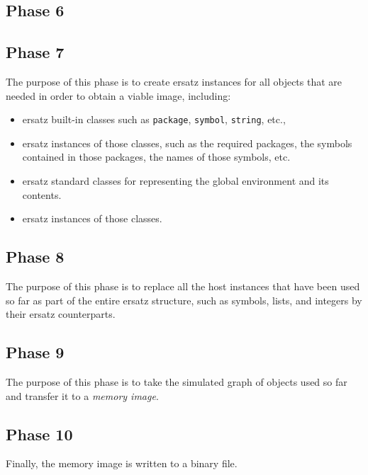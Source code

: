 \subsection{Phase 6}

\subsection{Phase 7}

The purpose of this phase is to create ersatz instances for all
objects that are needed in order to obtain a viable image, including:

\begin{itemize}
\item ersatz built-in classes such as \texttt{package}, \texttt{symbol},
  \texttt{string}, etc.,
\item ersatz instances of those classes, such as the required
  packages, the symbols contained in those packages, the names of
  those symbols, etc.
\item ersatz standard classes for representing the global environment
  and its contents.
\item ersatz instances of those classes.
\end{itemize}

\subsection{Phase 8}

The purpose of this phase is to replace all the host instances that
have been used so far as part of the entire ersatz structure, such as
symbols, lists, and integers by their ersatz counterparts.

\subsection{Phase 9}

The purpose of this phase is to take the simulated graph of objects
used so far and transfer it to a \emph{memory image}. 

\subsection{Phase 10}

Finally, the memory image is written to a binary file.
